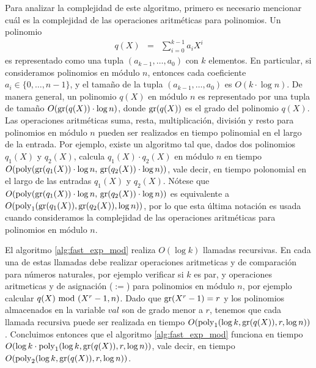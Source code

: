 Para analizar la complejidad de este algoritmo, primero es necesario mencionar cuál es la complejidad 
de las operaciones aritméticas para polinomios. Un polinomio 
\begin{eqnarray*}
q(X) & = & \sum_{i=0}^{k-1} a_i X^i
\end{eqnarray*}
es representado como una tupla $(a_{k-1}, \ldots, a_0)$ con $k$ elementos. En particular, si consideramos polinomios en módulo $n$, entonces cada coeficiente $a_i \in \{0, \ldots, n-1\}$, y el tamaño de la tupla $(a_{k-1}, \ldots, a_0)$ es $O(k \cdot \log n)$. De manera general, un polinomio $q(X)$ en módulo $n$ es representado por una tupla de tamaño $O({\rm gr}(q(X)) \cdot \log n)$, donde ${\rm gr}(q(X))$ es el grado del polinomio $q(X)$. Las operaciones aritméticas suma, resta, multiplicación, división y resto para polinomios en módulo $n$ pueden ser realizados en tiempo polinomial en el largo de la entrada. Por ejemplo, existe un algoritmo tal que, dados dos polinomios $q_1(X)$ y $q_2(X)$, calcula $q_1(X) \cdot q_2(X)$ en módulo $n$ en tiempo $O({\rm poly}({\rm gr}(q_1(X)) \cdot \log n,\, {\rm gr}(q_2(X)) \cdot \log n))$, vale decir, en tiempo polonomial en el largo de las entradas $q_1(X)$ y $q_2(X)$. Nótese que $O({\rm poly}({\rm gr}(q_1(X)) \cdot \log n,\, {\rm gr}(q_2(X)) \cdot \log n))$ es equivalente a $O({\rm poly}_1({\rm gr}(q_1(X)), {\rm gr}(q_2(X)), \log n))$, por lo que esta última notación es usada cuando consideramos la complejidad de las operaciones aritméticas para polinomios en módulo $n$. 


El algoritmo \ref{alg:fast_exp_mod} realiza $O(\log k)$ llamadas recursivas.
En cada una de estas llamadas debe realizar operaciones aritmeticas y de comparación para números naturales, por ejemplo verificar si $k$ es par, y operaciones aritmeticas y de asignación ($:=$) para polinomios en módulo $n$, por ejemplo calcular $q(X) \!\! \mod(X^r-1,n)$. Dado que ${\rm gr}(X^r - 1) = r$ y los polinomios almacenados en la variable $val$ son de grado menor a $r$, tenemos que cada llamada recursiva puede ser realizada en tiempo $O({\rm poly}_1(\log k, {\rm gr}(q(X)), r, \log n))$. Concluimos entonces que el algoritmo \ref{alg:fast_exp_mod} funciona en tiempo $O(\log k \cdot {\rm poly}_1(\log k, {\rm gr}(q(X)), r, \log n))$, vale decir, en tiempo $O({\rm poly}_2(\log k, {\rm gr}(q(X)), r, \log n))$.


